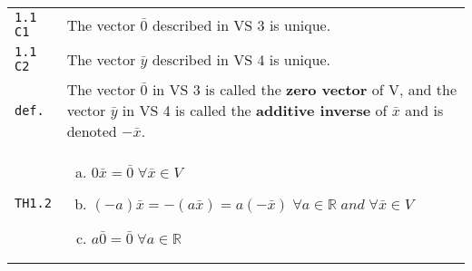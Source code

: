 \documentclass[10pt,landscape]{article}
\begin{document}
\begin{multicols}{3}
\begin{tabular}{@{}p{\the\MyLen}%
                @{}p{\linewidth-\the\MyLen}@{}}
\verb!1.1 C1! & The vector $\bar 0$ described in VS 3 is unique.\\
\verb!1.1 C2! & The vector $\bar y$ described in VS 4 is unique.\\
\verb!def.! & The vector $\bar 0$ in VS 3 is called the \textbf{zero vector} of V, and the vector $\bar y$ in VS 4 is called the \textbf{additive inverse} of $\bar x$ and is denoted $-\bar x$.\\
\verb!TH1.2! & \begin{enumerate}[a)]
			 \item $0\bar x = \bar 0 \; \forall \bar x \!\in\! V$
		         \item $(-a)\bar x = -(a\bar x) = a(-\bar x) \; \forall a\!\in\!\mathbb{R} \;and\; \forall\bar x\!\in\! V$
		   	 \item $a\bar 0 = \bar 0 \; \forall a\!\in\!\mathbb{R}$\end{enumerate}
\end{tabular}




\end{multicols}
\end{document}
